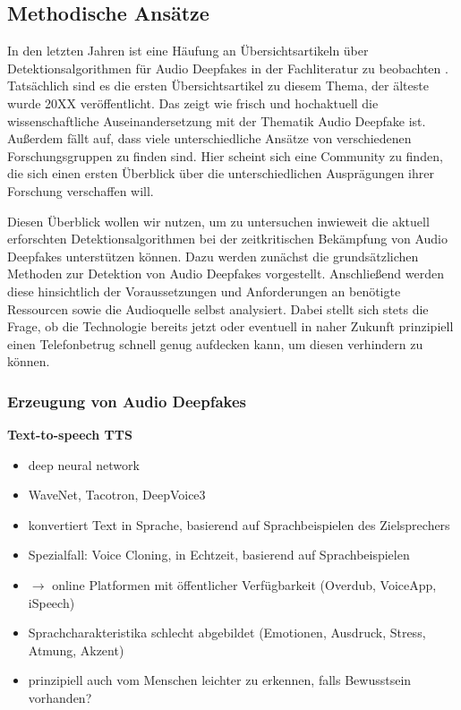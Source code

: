 \subsection{Methodische Ansätze}
In den letzten Jahren ist eine Häufung an Übersichtsartikeln über Detektionsalgorithmen für Audio Deepfakes in der Fachliteratur zu beobachten \citep[][]{Masood2022,Almutairi2022,Khanjani2021}.
Tatsächlich sind es die ersten Übersichtsartikel zu diesem Thema, der älteste wurde 20XX veröffentlicht. %
Das zeigt wie frisch und hochaktuell die wissenschaftliche Auseinandersetzung mit der Thematik Audio Deepfake ist.
Außerdem fällt auf, dass viele unterschiedliche Ansätze von verschiedenen Forschungsgruppen zu finden sind.
Hier scheint sich eine Community zu finden, die sich einen ersten Überblick über die unterschiedlichen Ausprägungen ihrer Forschung verschaffen will.

Diesen Überblick wollen wir nutzen, um zu untersuchen inwieweit die aktuell erforschten Detektionsalgorithmen bei der zeitkritischen Bekämpfung von Audio Deepfakes unterstützen können.
Dazu werden zunächst die grundsätzlichen Methoden zur Detektion von Audio Deepfakes vorgestellt.
Anschließend werden diese hinsichtlich der Voraussetzungen und Anforderungen an benötigte Ressourcen sowie die Audioquelle selbst analysiert.
Dabei stellt sich stets die Frage, ob die Technologie bereits jetzt oder eventuell in naher Zukunft prinzipiell einen Telefonbetrug schnell genug aufdecken kann, um diesen verhindern zu können.

\subsubsection{Erzeugung von Audio Deepfakes}
\textbf{Text-to-speech TTS} \citep[][]{Masood2022}
\begin{itemize}
  \item deep neural network
  \item WaveNet, Tacotron, DeepVoice3
  \item konvertiert Text in Sprache, basierend auf Sprachbeispielen des Zielsprechers
  \item Spezialfall: Voice Cloning, in Echtzeit, basierend auf Sprachbeispielen
  \item $\rightarrow$ online Platformen mit öffentlicher Verfügbarkeit (Overdub, VoiceApp, iSpeech)
  \item Sprachcharakteristika schlecht abgebildet (Emotionen, Ausdruck, Stress, Atmung, Akzent)
  \item prinzipiell auch vom Menschen \glqq{}leichter\grqq{} zu erkennen, falls Bewusstsein vorhanden?
\end{itemize}

